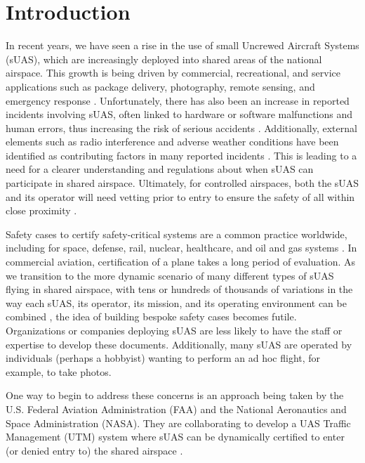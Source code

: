 \section {Introduction}
In recent years, we have seen a rise in the use of small Uncrewed Aircraft Systems (sUAS), which are increasingly deployed into shared areas of the national airspace. This growth is being driven by commercial, recreational, and service applications such as package delivery, photography, remote sensing, and emergency response \cite{Erdelj2017HelpFT,FAA}. Unfortunately, there has also been an increase in reported incidents involving sUAS, often linked to hardware or software malfunctions and human errors, thus increasing the risk of serious accidents \cite{cleland2022towards}. Additionally, external elements such as radio interference and adverse weather conditions have been identified as contributing factors in many reported incidents \cite{FAA,report3}.  This is leading to a need for a clearer understanding and regulations about when sUAS can participate in shared airspace. Ultimately, for controlled airspaces, both the sUAS and its operator will need vetting prior to entry to ensure the safety of all within close proximity \cite{gohar2024towards}.

Safety cases to certify safety-critical systems are a common practice worldwide, including for space, defense, rail, nuclear, healthcare, and oil and gas systems \cite{NASA12,Knig12, Hatcliff14, Leveson23}. 
In commercial aviation, certification of a plane takes a long period of evaluation. As we transition to the more dynamic scenario of many different types of sUAS flying in shared airspace, with tens or hundreds of thousands of variations in the way each sUAS, its operator, its mission, and its operating environment can be combined \cite{10.1145/3544548.3581003}, the idea of building bespoke safety cases becomes futile. Organizations or companies deploying sUAS are less likely to have the staff or expertise to develop these documents. Additionally, many sUAS are operated by individuals (perhaps a hobbyist) wanting to perform an ad hoc flight, for example, to take photos. 

One way to begin to address these concerns is an approach being taken by the U.S. Federal Aviation Administration (FAA) and the National Aeronautics and Space Administration (NASA). They are collaborating to develop a UAS Traffic Management (UTM) system where sUAS can be dynamically certified to enter (or denied entry to) the shared airspace \cite{UTM}.  

